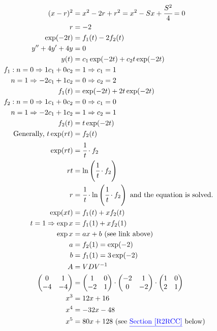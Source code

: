 \documentclass[12pt,a4paper]{article}
\begin{document}
\begin{align}
(x - r)^2 &= x^2 - 2r + r^2 = x^2 - S x + \cfrac{S^2}{4} = 0 \\
r &= -2 \\
\exp (-2t) &= f_1(t) - 2 f_2(t) \\
y'' + 4 y' + 4y &= 0 \\
y(t) &= c_1 \exp(-2t) + c_2 t \exp(-2t) \\
f_1: n = 0 \Rightarrow 1 c_1 + 0 c_2 &= 1 \Rightarrow c_1 = 1 \\
n = 1 \Rightarrow -2 c_1 + 1 c_2 &= 0 \Rightarrow c_2 = 2 \\
f_1(t) &= \exp(-2t) + 2 t \exp(-2t) \\
f_2: n = 0 \Rightarrow 1 c_1 + 0 c_2 &= 0 \Rightarrow c_1 = 0 \\
n = 1 \Rightarrow -2 c_1 + 1 c_2 &= 1 \Rightarrow c_2 = 1 \\
f_2(t) &= t \exp(-2t) \\
\text{Generally, } t \exp(r t) &= f_2(t) \\
\exp (rt) &= \cfrac{1}{t} \cdot f_2 \\
rt &= \ln \left(\cfrac{1}{t} \cdot f_2\right) \\
r &= \cfrac{1}{t} \cdot \ln \left(\cfrac{1}{t} \cdot f_2\right) \text{ and the equation is solved.} \\
\exp (xt) &= f_1(t) + x f_2(t) \\
t = 1 \Rightarrow \exp x &= f_1(1) + x f_2(1) \\
\exp x &= ax + b \text{ (see link above)} \\
a &= f_2(1) = \exp (-2) \\
b &= f_1(1) = 3 \exp (-2) \\
A &= VDV^{-1} \\
\left( \begin{matrix} 0 & 1 \\ -4 & -4 \end{matrix} \right)
&=
\left( \begin{matrix}  1 & 0 \\ -2 & 1  \end{matrix} \right) \cdot
\left( \begin{matrix} -2 & 1 \\  0 & -2 \end{matrix} \right) \cdot
\left( \begin{matrix}  1 & 0 \\  2 & 1  \end{matrix} \right) \\
x^3 &= 12x + 16 \\
x^4 &= -32x - 48 \\
x^5 &= 80x + 128 \text{ (see {\color{blue}\underline{Section \ref{R2RCC}}} below)}
\end{align}
\end{document}
